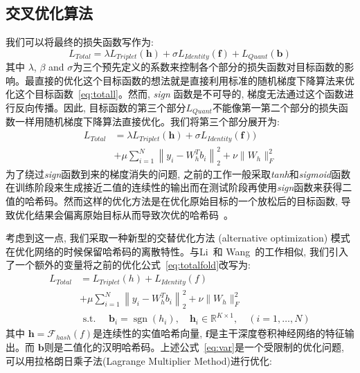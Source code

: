 \subsection{交叉优化算法}
我们可以将最终的损失函数写作为:
\begin{equation}
    L_{Total} = \lambda L_{Triplet}(\mathbf{h})  + \sigma L_{Identity}(\mathbf{f}) + L_{Quant}(\mathbf{b})
    \label{eq:totall}
\end{equation}
其中 $\lambda$, $\beta$ and $\sigma$为三个预先定义的系数来控制各个部分的损失函数对目标函数的影响。最直接的优化这个目标函数的想法就是直接利用标准的随机梯度下降算法来优化这个目标函数~\ref{eq:totall}。然而, \textit{sign} 函数是不可导的, 梯度无法通过这个函数进行反向传播。因此, 目标函数的第三个部分$L_{Quant}$不能像第一第二个部分的损失函数一样用随机梯度下降算法直接优化。我们将第三个部分展开为:
\begin{equation}
    \begin{aligned}
     L_{Total} &= \lambda L_{Triplet}(\mathbf{h})  + \sigma L_{Identity}(\mathbf{f})) \\
     &+\mu \sum_{i=1}^{N}\left\|y_{i}-W_h^{T} b_{i}\right\|_{2}^{2}+\nu\|W_h\|_{F}^{2} 
    \end{aligned}
       \label{eq:totalfold}
   \end{equation}
为了绕过\textit{sign}函数到来的梯度消失的问题, 之前的工作一般采取\textit{tanh}和\textit{sigmoid}函数在训练阶段来生成接近二值的连续性的输出而在测试阶段再使用\textit{sign}函数来获得二值的哈希码。然而这样的优化方法是在优化原始目标的一个放松后的目标函数, 导致优化结果会偏离原始目标从而导致次优的哈希码~\cite{liu2016deep}。\par
考虑到这一点, 我们采取一种新型的交替优化方法 (alternative optimization) 模式在优化网络的时候保留哈希码的离散特性。与Li~\cite{li2017deep}和 Wang~\cite{wang2017deep}的工作相似, 我们引入了一个额外的变量将之前的优化公式~\ref{eq:totalfold}改写为: 
\begin{equation}
    \begin{aligned}
L_{Total} &= L_{Triplet}(h) + L_{Identity}(f) \\
&+\mu \sum_{i=1}^{N}\left\|y_{i}-W_h^{T} b_{i}\right\|_{2}^{2}+\nu\|W_h\|_{F}^{2} \\
&\text { s.t. } \quad \mathbf{b}_{i}=\operatorname{sgn}\left(h_{i}\right), \quad \mathbf{h}_{i} \in \mathbb{R}^{K \times 1}, \quad(i=1, \ldots, N)
\end{aligned}
\label{eq:var}
\end{equation}
其中 $\mathbf{h} = \mathcal{F}_{hash}(f) $是连续性的实值哈希向量, $\mathbf{f}$是主干深度卷积神经网络的特征输出。而 $\mathbf{b}$则是二值化的汉明哈希码。上述公式~\ref{eq:var}是一个受限制的优化问题, 可以用拉格朗日乘子法(Lagrange Multiplier Method)进行优化:
